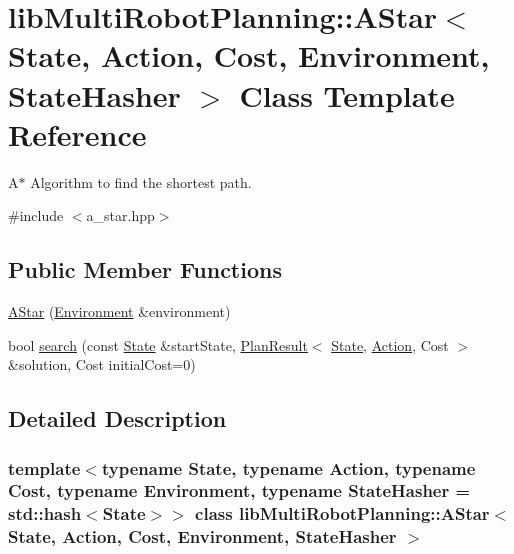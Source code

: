 \hypertarget{classlib_multi_robot_planning_1_1_a_star}{}\section{lib\+Multi\+Robot\+Planning\+:\+:A\+Star$<$ State, Action, Cost, Environment, State\+Hasher $>$ Class Template Reference}
\label{classlib_multi_robot_planning_1_1_a_star}


A$\ast$ Algorithm to find the shortest path.  




{\ttfamily \#include $<$a\+\_\+star.\+hpp$>$}

\subsection*{Public Member Functions}
\begin{DoxyCompactItemize}
\item 
\hyperlink{classlib_multi_robot_planning_1_1_a_star_a49f541dea7108ab1f3fe0b1f5004692b}{A\+Star} (\hyperlink{classlib_multi_robot_planning_1_1_environment}{Environment} \&environment)
\item 
bool \hyperlink{classlib_multi_robot_planning_1_1_a_star_acd703d42817f39d6027fa6432ca17ac9}{search} (const \hyperlink{structlib_multi_robot_planning_1_1_state}{State} \&start\+State, \hyperlink{structlib_multi_robot_planning_1_1_plan_result}{Plan\+Result}$<$ \hyperlink{structlib_multi_robot_planning_1_1_state}{State}, \hyperlink{namespacelib_multi_robot_planning_aba73fb71693f86a324adfa0e41e1053d}{Action}, Cost $>$ \&solution, Cost initial\+Cost=0)
\end{DoxyCompactItemize}


\subsection{Detailed Description}
\subsubsection*{template$<$typename State, typename Action, typename Cost, typename Environment, typename State\+Hasher = std\+::hash$<$\+State$>$$>$\newline
class lib\+Multi\+Robot\+Planning\+::\+A\+Star$<$ State, Action, Cost, Environment, State\+Hasher $>$}

